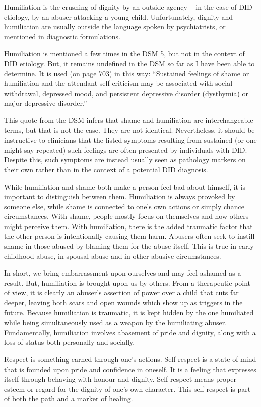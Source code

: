 \documentclass[]{book}
\begin{document}
Humiliation is the crushing of dignity by an outside agency -- in the case of DID etiology, by an abuser attacking a young child. Unfortunately, dignity and humiliation are usually outside the language spoken by psychiatrists, or mentioned in diagnostic formulations.

Humiliation is mentioned a few times in the DSM 5, but not in the context of DID etiology. But, it remains undefined in the DSM so far as I have been able to determine. It is used (on page 703) in this way: ``Sustained feelings of shame or humiliation and the attendant self-criticism may be associated with social withdrawal, depressed mood, and persistent depressive disorder (dysthymia) or major depressive disorder.''

This quote from the DSM infers that shame and humiliation are interchangeable terms, but that is not the case. They are not identical. Nevertheless, it should be instructive to clinicians that the listed symptoms resulting from sustained (or one might say repeated) such feelings are often presented by individuals with DID. Despite this, such symptoms are instead usually seen as pathology markers on their own rather than in the context of a potential DID diagnosis.

While humiliation and shame both make a person feel bad about himself, it is important to distinguish between them. Humiliation is always provoked by someone else, while shame is connected to one's own actions or simply chance circumstances. With shame, people mostly focus on themselves and how others might perceive them. With humiliation, there is the added traumatic factor that the other person is intentionally causing them harm. Abusers often seek to instill shame in those abused by blaming them for the abuse itself. This is true in early childhood abuse, in spousal abuse and in other abusive circumstances.

In short, we bring embarrassment upon ourselves and may feel ashamed as a result. But, humiliation is brought upon us by others. From a therapeutic point of view, it is clearly an abuser's assertion of power over a child that cuts far deeper, leaving both scars and open wounds which show up as triggers in the future. Because humiliation is traumatic, it is kept hidden by the one humiliated while being simultaneously used as a weapon by the humiliating abuser. Fundamentally, humiliation involves abasement of pride and dignity, along with a loss of status both personally and socially.

Respect is something earned through one's actions. Self-respect is a state of mind that is founded upon pride and confidence in oneself. It is a feeling that expresses itself through behaving with honour and dignity. Self-respect means proper esteem or regard for the dignity of one's own character. This self-respect is part of both the path and a marker of healing.
\end{document}
